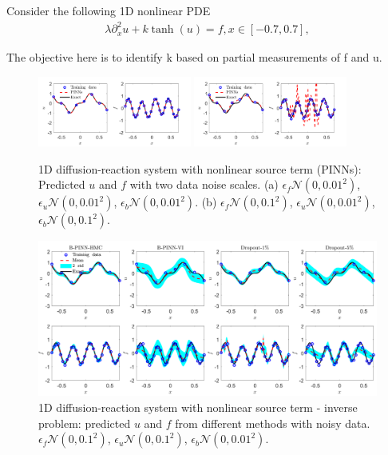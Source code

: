 \documentclass[conference,compsoc]{IEEEtran}
\begin{document}
Consider the following 1D nonlinear PDE
\begin{align}\label{eq:nonlinear}
    \lambda \partial^2_x u + k \tanh(u) = f , x \in [-0.7, 0.7],
\end{align}

The objective here is to identify k based on partial measurements of f and u.

\begin{figure}
    \includegraphics[width=0.45\textwidth]{figures/1D_inverse_pinn_001.png}
    \includegraphics[width=0.45\textwidth]{figures/1D_inverse_pinn_01.png}
    \caption{1D diffusion-reaction system with nonlinear source term (PINNs): Predicted $u$ and $f$ with two data noise scales.
        (a) $\epsilon_f \mathcal{N}(0, 0.01^2)$, $\epsilon_u  \mathcal{N}(0, 0.01^2)$, $\epsilon_b  \mathcal{N}(0, 0.01^2)$. 
        (b) $\epsilon_f  \mathcal{N}(0, 0.1^2)$, $\epsilon_u  \mathcal{N}(0, 0.01^2)$, $\epsilon_b                                \mathcal{N}(0,0.1^2)$\cite{yang2021b}.}
    \label{fig:pinninverse}
\end{figure}


\begin{figure}
    \centering
    \includegraphics[scale=0.25]{figures/1D_nonlinear_inverse_BNN_01.png}
    \caption{1D diffusion-reaction system with nonlinear source term - inverse problem: predicted $u$ and $f$ from different methods with noisy data. $\epsilon_f  \mathcal{N}(0, 0.1^2)$, $\epsilon_u  \mathcal{N}(0, 0.1^2)$, $\epsilon_b  \mathcal{N}(0, 0.01^2)$.\cite{yang2021b}}
\end{figure}
\end{document}
